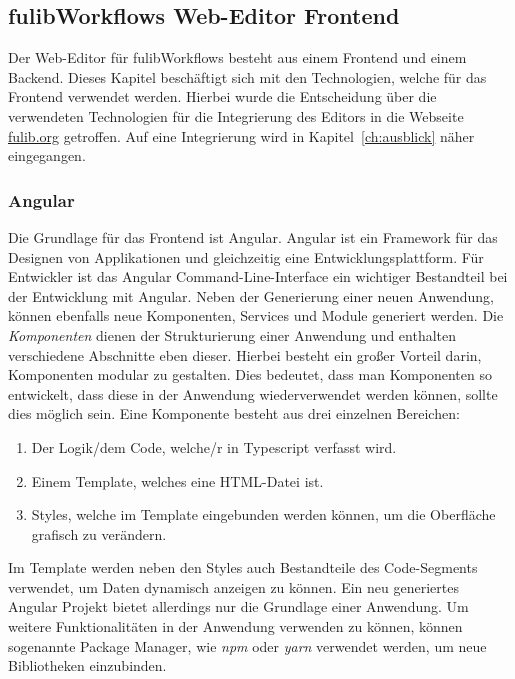 \subsection{fulibWorkflows Web-Editor Frontend}\label{subsec:fulibworkflows-web-editor}
Der Web-Editor für fulibWorkflows besteht aus einem Frontend und einem Backend.
Dieses Kapitel beschäftigt sich mit den Technologien, welche für das Frontend verwendet werden.
Hierbei wurde die Entscheidung über die verwendeten Technologien für die Integrierung des Editors in die Webseite \url{fulib.org} getroffen.
Auf eine Integrierung wird in Kapitel~\ref{ch:ausblick} näher eingegangen.

\subsubsection{Angular}
Die Grundlage für das Frontend ist Angular.
Angular ist ein Framework für das Designen von Applikationen und gleichzeitig eine Entwicklungsplattform.\cite*{angular}
Für Entwickler ist das Angular Command-Line-Interface ein wichtiger Bestandteil bei der Entwicklung mit Angular.
Neben der Generierung einer neuen Anwendung, können ebenfalls neue Komponenten, Services und Module generiert werden.
Die \textit{Komponenten} dienen der Strukturierung einer Anwendung und enthalten verschiedene Abschnitte eben dieser.
Hierbei besteht ein großer Vorteil darin, Komponenten modular zu gestalten.
Dies bedeutet, dass man Komponenten so entwickelt, dass diese in der Anwendung wiederverwendet werden können, sollte dies möglich sein.
Eine Komponente besteht aus drei einzelnen Bereichen:

\begin{enumerate}
    \item Der Logik/dem Code, welche/r in Typescript verfasst wird.
    \item Einem Template, welches eine HTML-Datei ist.
    \item Styles, welche im Template eingebunden werden können, um die Oberfläche grafisch zu verändern.
\end{enumerate}

Im Template werden neben den Styles auch Bestandteile des Code-Segments verwendet, um Daten dynamisch anzeigen zu können.
Ein neu generiertes Angular Projekt bietet allerdings nur die Grundlage einer Anwendung.
Um weitere Funktionalitäten in der Anwendung verwenden zu können, können sogenannte Package Manager, wie \textit{npm} oder \textit{yarn}
verwendet werden, um neue Bibliotheken einzubinden.

